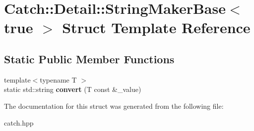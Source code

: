 \hypertarget{structCatch_1_1Detail_1_1StringMakerBase_3_01true_01_4}{}\section{Catch\+:\+:Detail\+:\+:String\+Maker\+Base$<$ true $>$ Struct Template Reference}
\label{structCatch_1_1Detail_1_1StringMakerBase_3_01true_01_4}
\subsection*{Static Public Member Functions}
\begin{DoxyCompactItemize}
\item 
\mbox{\label{structCatch_1_1Detail_1_1StringMakerBase_3_01true_01_4_af9b5fdf7fddd8c5c873caa819e5f00f6}} 
{\footnotesize template$<$typename T $>$ }\\static std\+::string {\bfseries convert} (T const \&\+\_\+value)
\end{DoxyCompactItemize}


The documentation for this struct was generated from the following file\+:\begin{DoxyCompactItemize}
\item 
catch.\+hpp\end{DoxyCompactItemize}
